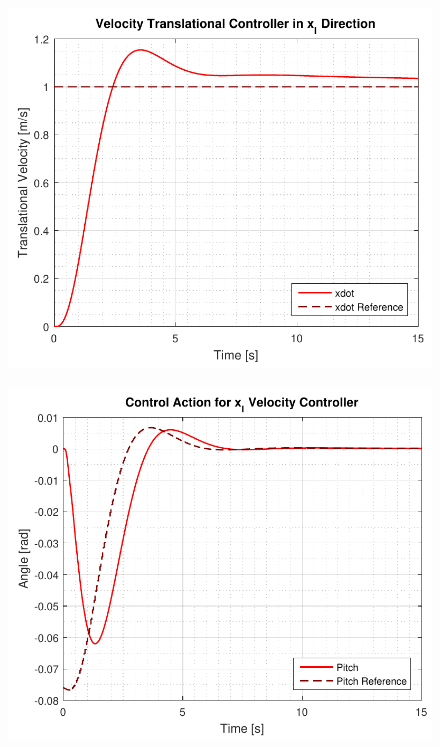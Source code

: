 \begin{minipage}{\linewidth}
    \begin{minipage}{0.46\linewidth}
        \begin{figure}[H]
            \includegraphics[scale=.6]{figures/velocityControllersXY}
            \centering			
            \label{fig:velocityControllersXY}
        \end{figure}
    \end{minipage}
    \hspace{0.03\linewidth}
    \begin{minipage}{0.46\linewidth}
        \begin{figure}[H]
            \includegraphics[scale=.6]{figures/velocityControllersXYAction}

\end{figure}
\end{minipage}
\end{minipage}
